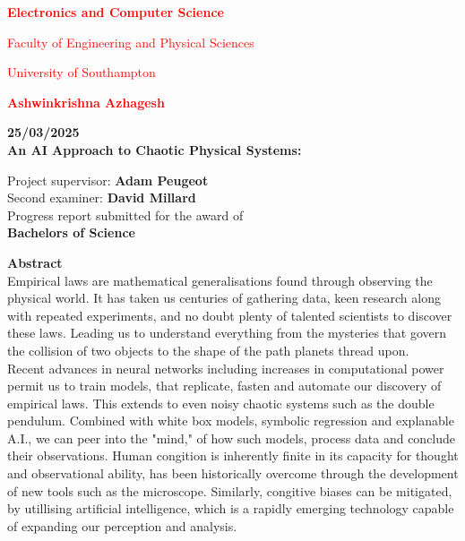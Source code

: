 \documentclass{article}
\begin{document}
\begin{center}
    \Large \textcolor{red}{\textbf{Electronics and Computer Science} \\[0.1cm]} 

    \large \textcolor{red}{Faculty of Engineering and Physical Sciences \\[0.1cm]} 

    \textcolor{red}{University of Southampton \\[1cm]} 

    \vspace{1cm} 

    \textcolor{red}{\textbf{\large Ashwinkrishna Azhagesh} \\[0.5cm]}

    \textbf{25/03/2025} \\[1cm] 

    \textbf{\large An AI Approach to Chaotic Physical Systems: } \\[1cm]

    \vspace{0.5cm}

    Project supervisor: \textbf{Adam Peugeot} \\[0.3cm] 
    Second examiner: \textbf{David Millard} \\[1cm]

    Progress report submitted for the award of \\[0.1cm]

    \textbf{\large Bachelors of Science} 
\end{center}

\newpage

{\Huge \textbf{Abstract}}\\[1cm]

Empirical laws are mathematical generalisations found through observing the physical world. It has taken us centuries of gathering data, keen research along with repeated experiments, and no doubt plenty of talented scientists to discover these laws. Leading us to understand everything from the mysteries that govern the collision of two objects to the shape of the path planets thread upon.\\

Recent advances in neural networks including increases in computational power permit us to train models, that replicate, fasten and automate our discovery of empirical laws. This extends to even noisy chaotic systems such as the double pendulum. Combined with white box models, symbolic regression and explanable A.I., we can peer into the "mind," of how such models, process data and conclude their observations. Human congition is inherently finite in its capacity for thought and observational ability, has been historically overcome through the development of new tools such as the microscope. Similarly, congitive biases can be mitigated, by utillising artificial intelligence, which is a rapidly emerging technology capable of expanding our perception and analysis.\\       
\end{document}
